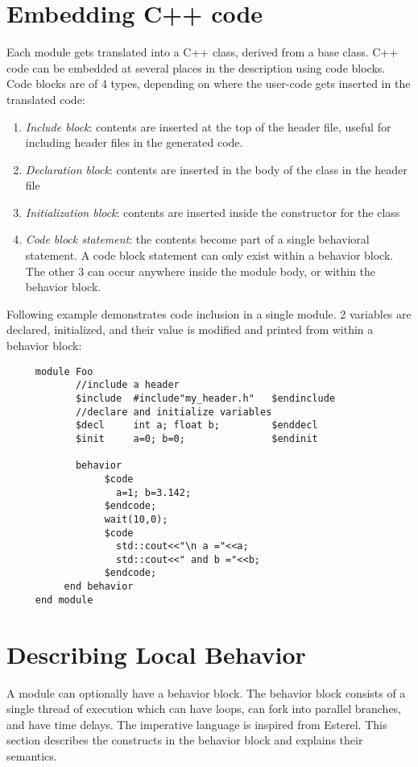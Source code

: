 	\section{Embedding C++ code}
	Each module gets translated into a C++ class,
	derived from a base class.
	C++ code can be embedded at several places in the 
	description using code blocks. Code blocks are of 4 
	types, depending on where the user-code gets inserted in
	the translated code:
	\begin{enumerate}
		\item \emph{Include block}:  contents are inserted at the top of the header file, useful for including
		header files in the generated code.
		\item \emph{Declaration block}: contents are inserted in the body of the class in the header file
		\item \emph{Initialization block}: contents are inserted inside the constructor for the class
		\item \emph{Code block statement}: the contents become part of a single behavioral statement.
		A code block statement can only exist within a behavior block. The other 3 can occur anywhere inside
		the module body, or within the behavior block.
	\end{enumerate}
	Following example demonstrates code inclusion in a single module. 2 variables are declared, initialized,
	and their value is modified and printed from within a behavior block:
	\begin{verbatim}
     module Foo
            //include a header
            $include  #include"my_header.h"   $endinclude
            //declare and initialize variables
            $decl     int a; float b;         $enddecl 
            $init     a=0; b=0;               $endinit

            behavior 
                 $code 
                   a=1; b=3.142;  
                 $endcode;
                 wait(10,0);
                 $code 
                   std::cout<<"\n a ="<<a;
                   std::cout<<" and b ="<<b;    
                 $endcode;
          end behavior
     end module
     \end{verbatim}


	




	\section{Describing Local Behavior}
	A module can optionally have a behavior block. 
	The behavior block consists of a single thread of execution
	which can have loops, can fork into parallel branches,
	and have time delays. The imperative language is
	inspired from Esterel\cite{esterel}.
	This section describes the constructs in the behavior block
	and explains their semantics.\\

